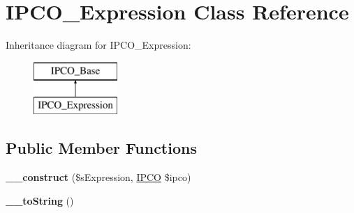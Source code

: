 \hypertarget{class_i_p_c_o___expression}{\section{I\-P\-C\-O\-\_\-\-Expression Class Reference}
\label{class_i_p_c_o___expression}
}
Inheritance diagram for I\-P\-C\-O\-\_\-\-Expression\-:\begin{figure}[H]
\begin{center}
\leavevmode
\includegraphics[height=2.000000cm]{class_i_p_c_o___expression}
\end{center}
\end{figure}
\subsection*{Public Member Functions}
\begin{DoxyCompactItemize}
\item 
\hypertarget{class_i_p_c_o___expression_a7fc06fc10cc45dd6dca5e87d744aaa33}{{\bfseries \-\_\-\-\_\-construct} (\$s\-Expression, \hyperlink{class_i_p_c_o}{I\-P\-C\-O} \$ipco)}\label{class_i_p_c_o___expression_a7fc06fc10cc45dd6dca5e87d744aaa33}

\item 
\hypertarget{class_i_p_c_o___expression_aa35a7f280cddeb0c334ce5a249d7d682}{{\bfseries \-\_\-\-\_\-to\-String} ()}\label{class_i_p_c_o___expression_aa35a7f280cddeb0c334ce5a249d7d682}

\end{DoxyCompactItemize}
